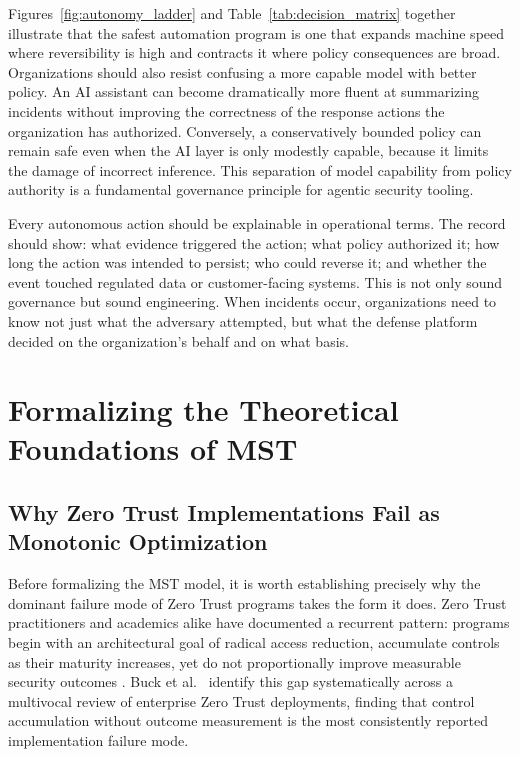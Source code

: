 \documentclass[acmlarge]{acmart}
\begin{document}
Figures~\ref{fig:autonomy_ladder} and Table~\ref{tab:decision_matrix} together illustrate
that the safest automation program is one that expands machine speed where reversibility
is high and contracts it where policy consequences are broad. Organizations should also
resist confusing a more capable model with better policy. An AI assistant can become
dramatically more fluent at summarizing incidents without improving the correctness of
the response actions the organization has authorized. Conversely, a conservatively
bounded policy can remain safe even when the AI layer is only modestly capable, because
it limits the damage of incorrect inference. This separation of model capability from
policy authority is a fundamental governance principle for agentic security tooling.

Every autonomous action should be explainable in operational terms. The record should
show: what evidence triggered the action; what policy authorized it; how long the action
was intended to persist; who could reverse it; and whether the event touched regulated
data or customer-facing systems. This is not only sound governance but sound engineering.
When incidents occur, organizations need to know not just what the adversary attempted,
but what the defense platform decided on the organization's behalf and on what basis.

\section{Formalizing the Theoretical Foundations of MST}
\label{sec:theory}

\subsection{Why Zero Trust Implementations Fail as Monotonic Optimization}
\label{sec:theory_failure}

Before formalizing the MST model, it is worth establishing precisely why the dominant
failure mode of Zero Trust programs takes the form it does. Zero Trust practitioners
and academics alike have documented a recurrent pattern: programs begin with an
architectural goal of radical access reduction, accumulate controls as their maturity
increases, yet do not proportionally improve measurable security outcomes
\cite{buck2021}. Buck et al.\ \cite{buck2021} identify this gap
systematically across a multivocal review of enterprise Zero Trust deployments,
finding that control accumulation without outcome measurement is the most
consistently reported implementation failure mode.
\end{document}
